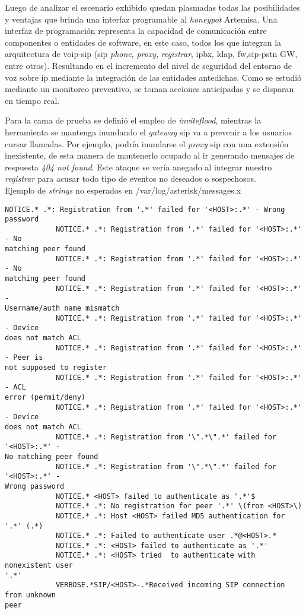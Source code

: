 \documentclass[a4paper,12pt]{report}
\newenvironment{myscriptlisting}
{\begin{list}{}{\setlength{\leftmargin}{1em}}\item\scriptsize\bfseries}
{\end{list}}
\begin{document}
Luego de analizar el escenario exhibido quedan plasmadas todas las posibilidades
y ventajas que brinda una interfaz programable al \emph{honeypot} Artemisa. Una
interfaz de programación representa la capacidad de comunicación entre
componentes o entidades de software, en este caso, todos los que integran la
arquitectura de \ac{voip}-\ac{sip} (\ac{sip} \emph{phone}, \emph{proxy}, \emph{registrar},
\ac{ipbx}, \ac{ldap}, \ac{fw},\ac{sip}-\ac{pstn} GW, entre otros). 
Resultando en el incremento del nivel de
seguridad del entorno de voz sobre \ac{ip} mediante la integración de las entidades
antedichas. Como se estudió mediante un monitoreo preventivo, se toman acciones
anticipadas y se disparan en tiempo real. 

Para la cama de prueba se definió el empleo de \emph{inviteflood},
mientras la herramienta se mantenga inundando el \emph{gateway} \ac{sip} va a
prevenir a los usuarios cursar llamadas. Por ejemplo, podría inundarse el
\emph{proxy} \ac{sip} con una extensión inexistente, de esta manera de mantenerlo
ocupado al ir generando mensajes de respuesta \emph{404 not found}. Este
ataque se vería anegado al integrar nuestro \emph{registrar} para acusar todo tipo de
eventos no deseados o sospechosos.\\

Ejemplo de \emph{strings} no esperados en /var/log/asterisk/messages.x
\begin{myscriptlisting}   
  \begin{verbatim}
NOTICE.* .*: Registration from '.*' failed for '<HOST>:.*' - Wrong password
            NOTICE.* .*: Registration from '.*' failed for '<HOST>:.*' - No
matching peer found
            NOTICE.* .*: Registration from '.*' failed for '<HOST>:.*' - No
matching peer found
            NOTICE.* .*: Registration from '.*' failed for '<HOST>:.*' -
Username/auth name mismatch
            NOTICE.* .*: Registration from '.*' failed for '<HOST>:.*' - Device
does not match ACL
            NOTICE.* .*: Registration from '.*' failed for '<HOST>:.*' - Peer is
not supposed to register
            NOTICE.* .*: Registration from '.*' failed for '<HOST>:.*' - ACL
error (permit/deny)
            NOTICE.* .*: Registration from '.*' failed for '<HOST>:.*' - Device
does not match ACL
            NOTICE.* .*: Registration from '\".*\".*' failed for '<HOST>:.*' -
No matching peer found
            NOTICE.* .*: Registration from '\".*\".*' failed for '<HOST>:.*' -
Wrong password
            NOTICE.* <HOST> failed to authenticate as '.*'$
            NOTICE.* .*: No registration for peer '.*' \(from <HOST>\)
            NOTICE.* .*: Host <HOST> failed MD5 authentication for '.*' (.*)
            NOTICE.* .*: Failed to authenticate user .*@<HOST>.*
            NOTICE.* .*: <HOST> failed to authenticate as '.*'
            NOTICE.* .*: <HOST> tried  to authenticate with nonexistent user
'.*'
            VERBOSE.*SIP/<HOST>-.*Received incoming SIP connection from unknown
peer
  \end{verbatim}
\end{myscriptlisting}
\end{document}
